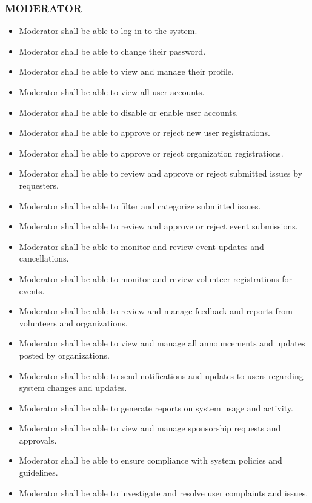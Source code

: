 \subsubsection*{MODERATOR}
\begin{itemize}
\itemsep0em 
    \item Moderator shall be able to log in to the system.
    \item Moderator shall be able to change their password.
    \item Moderator shall be able to view and manage their profile.
    \item Moderator shall be able to view all user accounts.
    \item Moderator shall be able to disable or enable user accounts.
    \item Moderator shall be able to approve or reject new user registrations.
    \item Moderator shall be able to approve or reject organization registrations.
    \item Moderator shall be able to review and approve or reject submitted issues by requesters.
    \item Moderator shall be able to filter and categorize submitted issues.
    \item Moderator shall be able to review and approve or reject event submissions.
    \item Moderator shall be able to monitor and review event updates and cancellations.
    \item Moderator shall be able to monitor and review volunteer registrations for events.
    \item Moderator shall be able to review and manage feedback and reports from volunteers and organizations.
    \item Moderator shall be able to view and manage all announcements and updates posted by organizations.
    \item Moderator shall be able to send notifications and updates to users regarding system changes and updates.
    \item Moderator shall be able to generate reports on system usage and activity.
    \item Moderator shall be able to view and manage sponsorship requests and approvals.
    \item Moderator shall be able to ensure compliance with system policies and guidelines.
    \item Moderator shall be able to investigate and resolve user complaints and issues.

\end{itemize}
